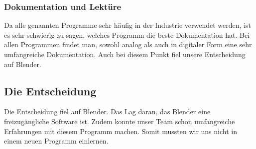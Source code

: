 \subsubsection{Dokumentation und Lektüre}
Da alle genannten Programme sehr häufig in der Industrie verwendet werden, ist es sehr schwierig zu sagen, welches Programm die beste Dokumentation hat. Bei allen Programmen findet man, sowohl analog als auch in digitaler Form eine sehr umfangreiche Dokumentation. Auch bei diesem Punkt fiel unsere Entscheidung auf Blender. 

\subsection{Die Entscheidung}
Die Entscheidung fiel auf Blender. Das Lag daran, das Blender eine freizugängliche Software ist. Zudem konnte unser Team schon umfangreiche Erfahrungen mit diesem Programm machen. Somit mussten wir uns nicht in einem neuen Programm einlernen.